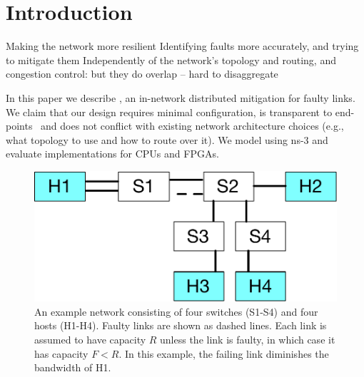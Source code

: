 \section{Introduction}

Making the network more resilient
Identifying faults more accurately, and trying to mitigate them
Independently of the network's topology and routing, and congestion control: but they do overlap -- hard to disaggregate  

In this paper we describe \OurSys, an in-network distributed mitigation for
faulty links.  We claim that our design requires minimal configuration, is
transparent to end-points~\cite{Saltzer84end-to-endarguments} and does not
conflict with existing network architecture choices (e.g., what topology to use
and how to route over it). We model \OurSys using ns-3 and evaluate
implementations for CPUs and FPGAs.


\begin{figure}
  \centering
  \includegraphics[width=0.3\paperwidth]{example_network.pdf}
  \caption{\label{fig:example-net}An example network consisting of four
    switches (S1-S4) and four hosts (H1-H4). Faulty links are shown as dashed lines.
    Each link is assumed to have capacity $R$ unless the link is faulty, in
    which case it has capacity $F < R$.  In this example, the failing link
    diminishes the bandwidth of H1.}
\end{figure}
